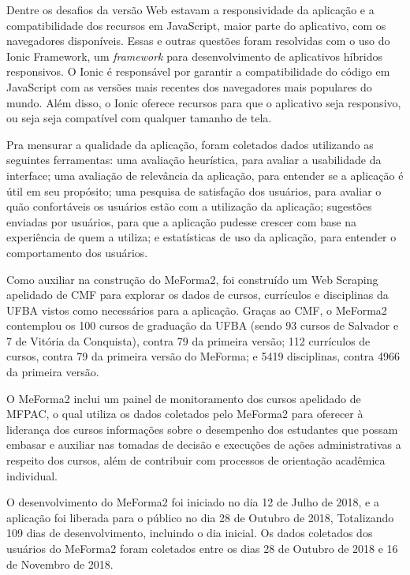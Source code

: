 Dentre os desafios da versão Web estavam a responsividade da aplicação e a compatibilidade dos recursos em JavaScript, maior parte do aplicativo, com os navegadores disponíveis. Essas e outras questões foram resolvidas com o uso do Ionic Framework, um \textit{framework} para desenvolvimento de aplicativos híbridos responsivos. O Ionic é responsável por garantir a compatibilidade do código em JavaScript com as versões mais recentes dos navegadores mais populares do mundo. Além disso, o Ionic oferece recursos para que o aplicativo seja responsivo, ou seja seja compatível com qualquer tamanho de tela.

Pra mensurar a qualidade da aplicação, foram coletados dados utilizando as seguintes ferramentas: uma avaliação heurística, para avaliar a usabilidade da interface; uma avaliação de relevância da aplicação, para entender se a aplicação é útil em seu propósito; uma pesquisa de satisfação dos usuários, para avaliar o quão confortáveis os usuários estão com a utilização da aplicação; sugestões enviadas por usuários, para que a aplicação pudesse crescer com base na experiência de quem a utiliza; e estatísticas de uso da aplicação, para entender o comportamento dos usuários.

Como auxiliar na construção do MeForma2, foi construído um Web Scraping apelidado de CMF para explorar os dados de cursos, currículos e disciplinas da UFBA vistos como necessários para a aplicação. Graças ao CMF, o MeForma2 contemplou os 100 cursos de graduação da UFBA (sendo 93 cursos de Salvador e 7 de Vitória da Conquista), contra 79 da primeira versão; 112 currículos de cursos, contra 79 da primeira versão do MeForma; e 5419 disciplinas, contra 4966 da primeira versão.

O MeForma2 inclui um painel de monitoramento dos cursos apelidado de MFPAC, o qual utiliza os dados coletados pelo MeForma2 para oferecer à liderança dos cursos informações sobre o desempenho dos estudantes que possam embasar e auxiliar nas tomadas de decisão e execuções de ações administrativas a respeito dos cursos, além de contribuir com processos de orientação acadêmica individual.

O desenvolvimento do MeForma2 foi iniciado no dia 12 de Julho de 2018, e a aplicação foi liberada para o público no dia 28 de Outubro de 2018, Totalizando 109 dias de desenvolvimento, incluindo o dia inicial. Os dados coletados dos usuários do MeForma2 foram coletados entre os dias 28 de Outubro de 2018 e 16 de Novembro de 2018.
